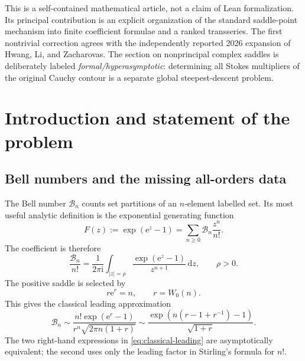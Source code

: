 \documentclass[11pt,a4paper]{article}
\theoremstyle{definition}
\theoremstyle{remark}
\newcommand{\Bell}{\mathcal B}
\newcommand{\ii}{\mathrm i}
\newcommand{\ee}{\mathrm e}
\newcommand{\dd}{\,\mathrm d}
\begin{document}
\begin{auditbox}
This is a self-contained mathematical article, not a claim of Lean
formalization.  Its principal contribution is an explicit organization of the
standard saddle-point mechanism into finite coefficient formulae and a ranked
transseries.  The first nontrivial correction agrees with the independently
reported 2026 expansion of Hwang, Li, and Zacharovas.  The section on nonprincipal
complex saddles is deliberately labeled \emph{formal/hyperasymptotic}: determining
all Stokes multipliers of the original Cauchy contour is a separate global
steepest-descent problem.
\end{auditbox}

\tableofcontents
\newpage

\section{Introduction and statement of the problem}

\subsection{Bell numbers and the missing all-orders data}

The Bell number \(\Bell_n\) counts set partitions of an \(n\)-element labelled
set.  Its most useful analytic definition is the exponential generating
function
\begin{equation}\label{eq:bell-egf}
  F(z):=\exp(\ee^z-1)
       =\sum_{n\ge0}\Bell_n\frac{z^n}{n!}.
\end{equation}
The coefficient is therefore
\begin{equation}\label{eq:cauchy-basic}
 \frac{\Bell_n}{n!}
 =\frac{1}{2\pi\ii}\int_{|z|=\rho}
   \frac{\exp(\ee^z-1)}{z^{n+1}}\dd z,
 \qquad \rho>0.
\end{equation}
The positive saddle is selected by
\begin{equation}\label{eq:saddle-equation}
   r\ee^r=n,
   \qquad r=W_0(n).
\end{equation}
This gives the classical leading approximation
\begin{equation}\label{eq:classical-leading}
 \Bell_n\sim
 \frac{n!\exp(\ee^r-1)}{r^n\sqrt{2\pi n(1+r)}}
 \sim\frac{\exp\!\left(n(r-1+r^{-1})-1\right)}{\sqrt{1+r}}.
\end{equation}
The two right-hand expressions in \cref{eq:classical-leading} are
asymptotically equivalent; the second uses only the leading factor in
Stirling's formula for \(n!\).
\end{document}
